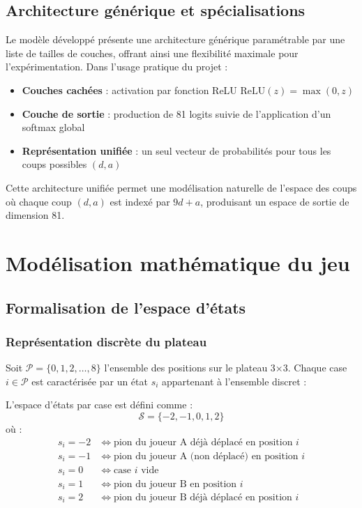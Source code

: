 \documentclass[12pt,a4paper]{report}
\numberwithin{equation}{section}
\begin{document}
\section{Architecture générique et spécialisations}
Le modèle développé présente une architecture générique paramétrable par une liste de tailles de couches, offrant ainsi une flexibilité maximale pour l'expérimentation. Dans l'usage pratique du projet :
\begin{itemize}
  \item \textbf{Couches cachées} : activation par fonction ReLU $\text{ReLU}(z) = \max(0, z)$
  \item \textbf{Couche de sortie} : production de 81 logits suivie de l'application d'un softmax global
  \item \textbf{Représentation unifiée} : un seul vecteur de probabilités pour tous les coups possibles $(d,a)$
\end{itemize}

Cette architecture unifiée permet une modélisation naturelle de l'espace des coups où chaque coup $(d,a)$ est indexé par $9d + a$, produisant un espace de sortie de dimension 81.

\chapter{Modélisation mathématique du jeu}

\section{Formalisation de l'espace d'états}

\subsection{Représentation discrète du plateau}
Soit $\mathcal{P} = \{0, 1, 2, \ldots, 8\}$ l'ensemble des positions sur le plateau 3×3. Chaque case $i \in \mathcal{P}$ est caractérisée par un état $s_i$ appartenant à l'ensemble discret :

\begin{definition}
L'espace d'états par case est défini comme :
$$\mathcal{S} = \{-2, -1, 0, 1, 2\}$$
où :
\begin{align}
s_i = -2 &\iff \text{pion du joueur A déjà déplacé en position } i\\
s_i = -1 &\iff \text{pion du joueur A (non déplacé) en position } i\\
s_i = 0 &\iff \text{case } i \text{ vide}\\
s_i = 1 &\iff \text{pion du joueur B en position } i\\
s_i = 2 &\iff \text{pion du joueur B déjà déplacé en position } i
\end{align}
\end{definition}
\end{document}

